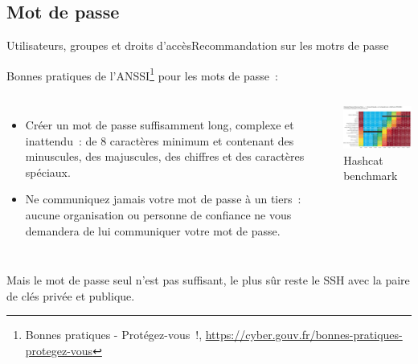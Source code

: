 \documentclass{beamer}
\begin{document}
    \subsection{Mot de passe}\label{subsec:password}
    \begin{frame}{Utilisateurs, groupes et droits d'accès}{Recommandation sur les motrs de passe}
        \begin{footnotesize}
            Bonnes pratiques de l'ANSSI\footnote{Bonnes pratiques - Protégez-vous~!, \url{https://cyber.gouv.fr/bonnes-pratiques-protegez-vous}} pour les mots de passe~:
            \begin{columns}
                \begin{itemize}
                    \item Créer un mot de passe suffisamment long, complexe et inattendu~:
                    de 8 caractères minimum et contenant des minuscules, des majuscules,
                    des chiffres et des caractères spéciaux.

                    \item Ne communiquez jamais votre mot de passe à un tiers~: aucune
                    organisation ou personne de confiance ne vous demandera de lui
                    communiquer votre mot de passe.

                \end{itemize}
                \centering
                \includegraphics[width=6.5cm]{image/real-password-cracking} \\ Hashcat benchmark\footnotemark \\
            \end{columns}
            Mais le mot de passe seul n'est pas suffisant, le plus sûr reste le SSH avec la paire de clés privée et publique.
        \end{footnotesize}
    \end{frame}
\end{document}
